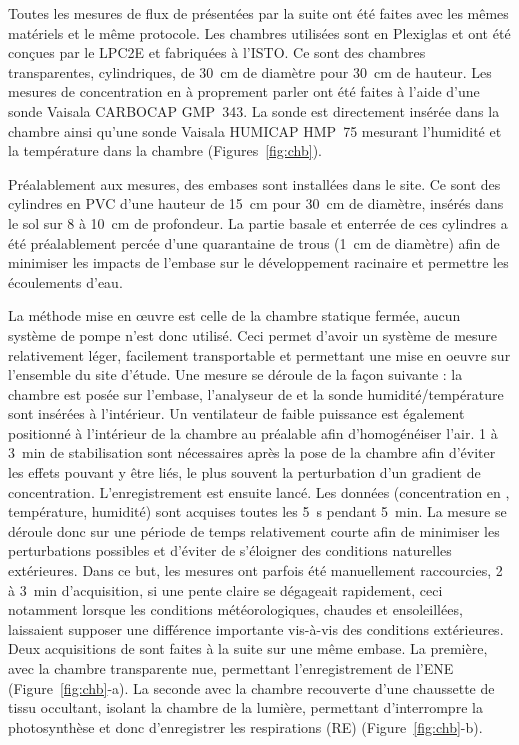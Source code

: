 Toutes les mesures de flux de \coo présentées par la suite ont été faites avec les mêmes matériels et le même protocole.
Les chambres utilisées sont en Plexiglas\textsuperscript{\textregistered} et ont été conçues par le LPC2E et fabriquées à l'ISTO.
Ce sont des chambres transparentes, cylindriques, de \SI{30}{\centi\metre} de diamètre pour \SI{30}{\centi\metre} de hauteur.
Les mesures de concentration en \coo à proprement parler ont été faites à l'aide d'une sonde Vaisala CARBOCAP\textsuperscript{\textregistered} GMP~343.
La sonde est directement insérée dans la chambre ainsi qu'une sonde Vaisala HUMICAP\textsuperscript{\textregistered} HMP~75 mesurant l'humidité et la température dans la chambre (Figures~\ref{fig:chb}).

Préalablement aux mesures, des embases sont installées dans le site.
Ce sont des cylindres en PVC d'une hauteur de \SI{15}{\centi\metre} pour \SI{30}{\centi\metre} de diamètre, insérés dans le sol sur 8 à \SI{10}{\centi\metre} de profondeur.
La partie basale et enterrée de ces cylindres a été préalablement percée d'une quarantaine de trous (\SI{1}{\centi\metre} de diamètre) afin de minimiser les impacts de l'embase sur le développement racinaire et permettre les écoulements d'eau.

La méthode mise en œuvre est celle de la chambre statique fermée, aucun système de pompe n'est donc utilisé.
Ceci permet d'avoir un système de mesure relativement léger, facilement transportable et permettant une mise en oeuvre sur l'ensemble du site d'étude.
Une mesure se déroule de la façon suivante :
la chambre est posée sur l'embase, l'analyseur de \coo et la sonde humidité/température sont insérées à l'intérieur.
Un ventilateur de faible puissance est également positionné à l'intérieur de la chambre au préalable afin d'homogénéiser l'air.
1 à \SI{3}{\minute} de stabilisation sont nécessaires après la pose de la chambre afin d'éviter les effets pouvant y être liés, le plus souvent la perturbation d'un gradient de concentration.
L’enregistrement est ensuite lancé.
Les données (concentration en \coo, température, humidité) sont acquises toutes les \SI{5}{\second} pendant \SI{5}{\minute}.
La mesure se déroule donc sur une période de temps relativement courte afin de minimiser les perturbations possibles et d'éviter de s'éloigner des conditions naturelles extérieures.
Dans ce but, les mesures ont parfois été manuellement raccourcies, 2 à \SI{3}{\minute} d'acquisition, si une pente claire se dégageait rapidement, ceci notamment lorsque les conditions météorologiques, chaudes et ensoleillées, laissaient supposer une différence importante vis-à-vis des conditions extérieures.
Deux acquisitions de \coo sont faites à la suite sur une même embase.
La première, avec la chambre transparente nue, permettant l'enregistrement de l'ENE (Figure~\ref{fig:chb}-a).
La seconde avec la chambre recouverte d'une chaussette de tissu occultant, isolant la chambre de la lumière, permettant d'interrompre la photosynthèse et donc d'enregistrer les respirations (RE) (Figure~\ref{fig:chb}-b).

